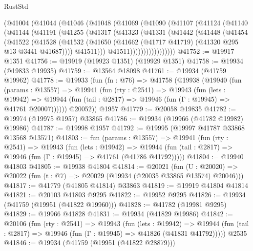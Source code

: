\begin{lexlean}{RustStd}
\begin{coremodule}
    (@41004
      (@41044
        (@41046
          (@41048
            (@41069
              (@41090
                (@41107
                  (@41124
                    (@41140
                      (@41144
                        (@41191
                          (@41255
                            (@41317
                              (@41323
                                (@41331
                                  (@41442
                                    (@41448
                                      (@41454
                                        (@41522
                                          (@41528
                                            (@41532
                                              (@41650
                                                (@41662
                                                  (@41717 @41719)
                                                  (@41320 @295 @13 @3441 @41687))))
                                            @41511)))
                                      @41511)))))))))))))))))
@41752 := @19917 @1351
@41756 := @19919 (@19923 @1351) (@19929 @1351)
@41758 := @19934 (@19833 @19935)
@41759 := @13564 @18098
@41761 := @19934 (@41759 @19962)
@41778 := @19933
    (fun (fn : @76) =>
    @41758
      (@19938
        (@19940
          (fun (params : @13557) =>
          @19941
            (fun (rty : @2541) =>
            @19943
              (fun (lets : @19942) =>
              @19944 (fun (tail : @2817) => @19946 (fun (Γ : @19945) => @41761 @20007))))))
        @20052))
    @1957
@41779 := @20058 @19835
@41782 := @19974 (@19975 @1957) @33865
@41786 := @19934 (@19966 (@41782 @19982) @19986)
@41787 := @19998 @1957
@41792 := @19995 (@19997 @41787 @33868 @13568 @13571)
@41803 := fun (params : @13557) =>
  @19941
    (fun (rty : @2541) =>
    @19943
      (fun (lets : @19942) =>
      @19944 (fun (tail : @2817) => @19946 (fun (Γ : @19945) => @41761 (@41786 @41792)))))
@41804 := @19940 @41803
@41805 := @19938 @41804
@41814 := @20021
    (fun (U : @20020) => @20022 (fun (t : @7) => @20029 (@19934 (@20035 @33865 @13574) @20046)))
@41817 := @41779 (@41805 @41814) @33863
@41819 := @19919 @41804 @41814
@41821 := @20103 @41803 @9295
@41822 := @19952 @9295
@41826 := @19934 (@41759 (@19951 (@41822 @19960)))
@41828 := @41782 (@19981 @9295)
@41829 := @19966 @41828
@41831 := @19934 (@41829 @19986)
@41842 := @20106
    (fun (rty : @2541) =>
    @19943
      (fun (lets : @19942) =>
      @19944 (fun (tail : @2817) => @19946 (fun (Γ : @19945) => @41826 (@41831 @41792)))))
    @2535
@41846 := @19934 (@41759 (@19951 (@41822 @28879)))

\end{coremodule}
\end{lexlean}
